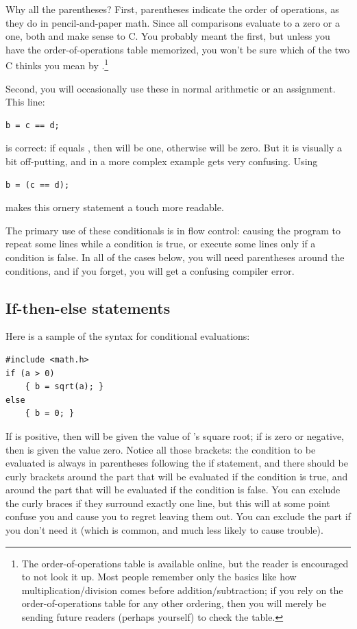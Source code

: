 Why all the parentheses? First, parentheses indicate the order of
operations, as they do in pencil-and-paper math. Since all comparisons
evaluate to a zero or a one, both 
and  make sense to C. You probably meant
the first, but unless you have the order-of-operations table memorized,
you won't be sure which of the two C thinks you mean by .\footnote{The order-of-operations table is available
online, but the reader is encouraged to not look it up. Most
people remember only the basics like how multiplication/division comes before
addition/subtraction; if you rely on the order-of-operations table
for any other ordering, then you will merely be sending future readers
(perhaps yourself) to check the table.}

Second, you will occasionally use these in normal arithmetic or an assignment. This line:
\begin{lstlisting}
b = c == d;
\end{lstlisting}
is correct: if  equals , then  will be one, otherwise  will be zero. But
it is visually a bit off-putting, and in a more complex example gets very confusing. Using
\begin{lstlisting}
b = (c == d);
\end{lstlisting}
makes this ornery statement a touch more readable.

The primary use of these conditionals is in flow control: causing
the program to repeat some lines while a condition is true, or execute some lines only if a condition is
false.  In all of the cases below, you will need parentheses around the conditions, and if you forget,
you will get a confusing compiler error.

\subsection{If-then-else statements} Here is a sample of the syntax for conditional evaluations: 

\begin{lstlisting}
#include <math.h>
if (a > 0)
    { b = sqrt(a); }
else 
    { b = 0; }
\end{lstlisting}
If  is positive, then  will be given the value of 's square root; if  is
zero or negative, then  is given the value zero. Notice all those brackets: the condition to be
evaluated is always in parentheses following the if statement, and there should be curly brackets around
the part that will be evaluated if the condition is true, and around the part that will be evaluated if
the condition is false. You can exclude the curly braces if they surround exactly one line, but this
will at some point confuse you and cause you to regret leaving them out.
You can exclude the  part if you don't need it (which is
common, and much less likely to cause trouble).

